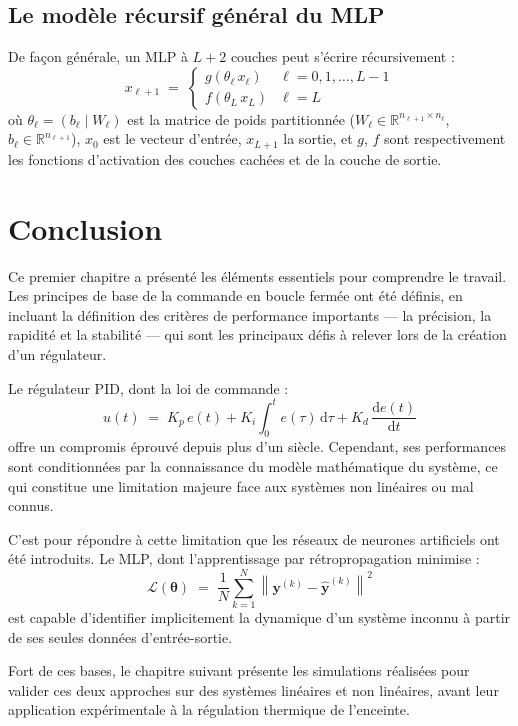 \subsection{Le modèle récursif général du MLP}

De façon générale, un MLP à $L+2$ couches peut s'écrire
récursivement :
\[
x_{\ell+1} \;=\;
\begin{cases}
	g(\theta_\ell\, x_\ell) & \ell = 0, 1, \ldots, L-1 \\
	f(\theta_L\, x_L)       & \ell = L
\end{cases}
\]
où $\theta_\ell = (b_\ell \mid W_\ell)$ est la matrice de poids
partitionnée ($W_\ell \in \mathbb{R}^{n_{\ell+1} \times n_\ell}$,
$b_\ell \in \mathbb{R}^{n_{\ell+1}}$), $x_0$ est le vecteur
d'entrée, $x_{L+1}$ la sortie, et $g$, $f$ sont respectivement
les fonctions d'activation des couches cachées et de la couche
de sortie.

\section*{Conclusion}

Ce premier chapitre a présenté les éléments essentiels pour comprendre le travail. Les principes de base de la commande en boucle fermée ont été définis, en incluant la définition des critères de performance importants — la précision, la rapidité et la stabilité — qui sont les principaux défis à relever lors de la création d'un régulateur.

Le régulateur PID, dont la loi de commande :
\[
u(t) \;=\; K_p\,e(t)
+ K_i\int_{0}^{t} e(\tau)\,\mathrm{d}\tau
+ K_d\,\frac{\mathrm{d}e(t)}{\mathrm{d}t}
\]
offre un compromis éprouvé depuis plus d'un siècle. Cependant,
ses performances sont conditionnées par la connaissance du modèle
mathématique du système, ce qui constitue une limitation majeure
face aux systèmes non linéaires ou mal connus.

C'est pour répondre à cette limitation que les réseaux de neurones
artificiels ont été introduits. Le MLP, dont l'apprentissage par
rétropropagation minimise :
\[
\mathcal{L}(\boldsymbol{\theta}) \;=\;
\frac{1}{N}\sum_{k=1}^{N}
\left\| \mathbf{y}^{(k)} - \hat{\mathbf{y}}^{(k)} \right\|^2
\]
est capable d'identifier implicitement la dynamique d'un système
inconnu à partir de ses seules données d'entrée-sortie.

Fort de ces bases, le chapitre suivant présente les simulations
réalisées pour valider ces deux approches sur des systèmes
linéaires et non linéaires, avant leur application expérimentale
à la régulation thermique de l'enceinte.